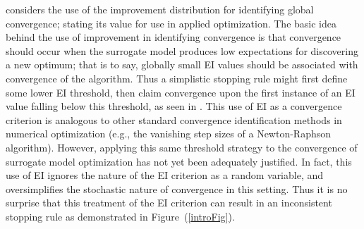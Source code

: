 \documentclass[12pt]{article}
\begin{document}
%
%

\cite{taddyOpt} considers the use of the improvement distribution for identifying global convergence; stating its value for use in applied optimization.
The basic idea behind the use of improvement in identifying convergence is that convergence should occur when the surrogate model produces low expectations for discovering a new optimum; that is to say, globally small EI values should be associated with convergence of the algorithm.
Thus a simplistic stopping rule might first define some lower EI threshold, then claim convergence upon the first instance of an EI value falling below this threshold, as seen in \cite{windExample}.    
This use of EI as a convergence criterion is analogous to other standard convergence identification methods in numerical optimization (e.g., the vanishing step sizes of a Newton-Raphson algorithm).
%
However, applying this same threshold strategy to the convergence of surrogate model optimization has not yet been adequately justified.
In fact, this use of EI ignores the nature of the EI criterion as a random variable, and oversimplifies the stochastic nature of convergence in this setting.
%
Thus it is no surprise that this treatment of the EI criterion can result in an inconsistent stopping rule as demonstrated in \mbox{Figure (\ref{introFig}).}  
\end{document}
